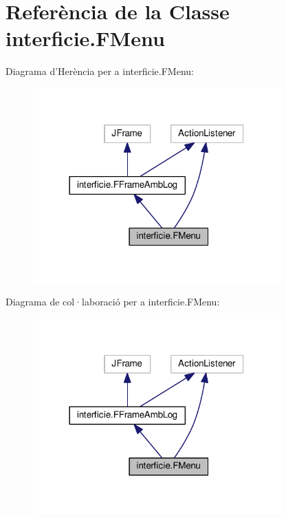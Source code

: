 \hypertarget{classinterficie_1_1_f_menu}{\section{Referència de la Classe interficie.\+F\+Menu}
\label{classinterficie_1_1_f_menu}
}


Diagrama d'Herència per a interficie.\+F\+Menu\+:\nopagebreak
\begin{figure}[H]
\begin{center}
\leavevmode
\includegraphics[width=270pt]{classinterficie_1_1_f_menu__inherit__graph}
\end{center}
\end{figure}


Diagrama de col·laboració per a interficie.\+F\+Menu\+:\nopagebreak
\begin{figure}[H]
\begin{center}
\leavevmode
\includegraphics[width=270pt]{classinterficie_1_1_f_menu__coll__graph}
\end{center}
\end{figure}
